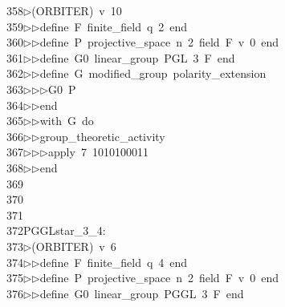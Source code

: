 \begin{tabbing}
358\>$\triangleright$\>(ORBITER)\ v\ 10\ \\[0pt]
359\>$\triangleright$\>$\triangleright$\>define\ F\ finite\_field\ q\ 2\ end\ \\[0pt]
360\>$\triangleright$\>$\triangleright$\>define\ P\ projective\_space\ n\ 2\ field\ F\ v\ 0\ end\ \\[0pt]
361\>$\triangleright$\>$\triangleright$\>define\ G0\ linear\_group\ PGL\ 3\ F\ end\ \\[0pt]
362\>$\triangleright$\>$\triangleright$\>define\ G\ modified\_group\ polarity\_extension\ \\[0pt]
363\>$\triangleright$\>$\triangleright$\>$\triangleright$\>G0\ P\ \\[0pt]
364\>$\triangleright$\>$\triangleright$\>end\ \\[0pt]
365\>$\triangleright$\>$\triangleright$\>with\ G\ do\ \\[0pt]
366\>$\triangleright$\>$\triangleright$\>group\_theoretic\_activity\ \\[0pt]
367\>$\triangleright$\>$\triangleright$\>$\triangleright$\>apply\ 7\ 1010100011\ \\[0pt]
368\>$\triangleright$\>$\triangleright$\>end\\[0pt]
369\>\\[0pt]
370\>\\[0pt]
371\>\\[0pt]
372\>PGGLstar\_3\_4:\\[0pt]
373\>$\triangleright$\>(ORBITER)\ v\ 6\ \\[0pt]
374\>$\triangleright$\>$\triangleright$\>define\ F\ finite\_field\ q\ 4\ end\ \\[0pt]
375\>$\triangleright$\>$\triangleright$\>define\ P\ projective\_space\ n\ 2\ field\ F\ v\ 0\ end\ \\[0pt]
376\>$\triangleright$\>$\triangleright$\>define\ G0\ linear\_group\ PGGL\ 3\ F\ end\ \\[0pt]

\end{tabbing}
